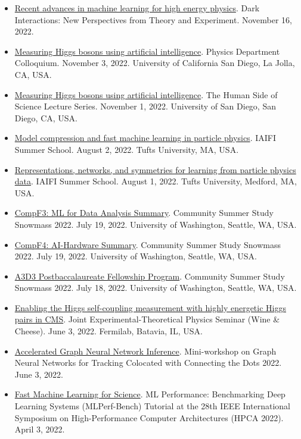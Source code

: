 \documentclass[11pt]{res}
\begin{document}
\begin{resume}
\begin{itemize}
    \item \href{https://indico.cern.ch/event/1211501/contributions/5128872/}{Recent advances in machine learning for high energy physics}. Dark Interactions: New Perspectives from Theory and Experiment. November 16, 2022.
    \item \href{https://indico.cern.ch/event/1219204/}{Measuring Higgs bosons using artificial intelligence}. Physics Department Colloquium. November 3, 2022. University of California San Diego, La Jolla, CA, USA.
    \item \href{https://www.sandiego.edu/events/cas/detail.php?_focus=86860}{Measuring Higgs bosons using artificial intelligence}. The Human Side of Science Lecture Series. November 1, 2022. University of San Diego, San Diego, CA, USA.
    \item \href{https://iaifi.org/summer-school-agenda}{Model compression and fast machine learning in particle physics}. IAIFI Summer School. August 2, 2022. Tufts University, MA, USA.
    \item \href{https://iaifi.org/summer-school-agenda}{Representations, networks, and symmetries for learning from particle physics data}. IAIFI Summer School. August 1, 2022. Tufts University, Medford, MA, USA.
    \item \href{https://indico.fnal.gov/event/22303/contributions/245447}{CompF3: ML for Data Analysis Summary}. Community Summer Study Snowmass 2022. July 19, 2022. University of Washington, Seattle, WA, USA.
    \item \href{https://indico.fnal.gov/event/22303/contributions/245914}{CompF4: AI-Hardware Summary}. Community Summer Study Snowmass 2022. July 19, 2022. University of Washington, Seattle, WA, USA.
    \item \href{https://indico.fnal.gov/event/22303/contributions/244766}{A3D3 Postbaccalaureate Fellowship Program}. Community Summer Study Snowmass 2022. July 18, 2022. University of Washington, Seattle, WA, USA.
    \item \href{https://indico.fnal.gov/event/55499/}{Enabling the Higgs self-coupling measurement with highly energetic Higgs pairs in CMS}. Joint Experimental-Theoretical Physics Seminar (Wine \& Cheese). June 3, 2022. Fermilab, Batavia, IL, USA.
    \item \href{https://indico.cern.ch/event/1128328/contributions/4900731/}{Accelerated Graph Neural Network Inference}. Mini-workshop on Graph Neural Networks for Tracking Colocated with Connecting the Dots 2022. June 3, 2022.
    \item \href{https://sites.google.com/g.harvard.edu/mlperf-bench-hpca22/home}{Fast Machine Learning for Science}. ML Performance: Benchmarking Deep Learning Systems (MLPerf-Bench) Tutorial at the 28th IEEE International Symposium on High-Performance Computer Architectures (HPCA 2022). April 3, 2022.

\end{itemize}
\end{resume}
\end{document}
